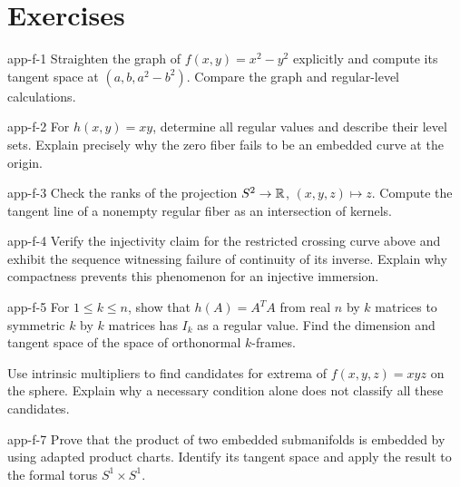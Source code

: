 \section*{Exercises}
\begin{hexercise}{app-f-1}
Straighten the graph of $f(x,y)=x^2-y^2$ explicitly and compute its tangent
space at $(a,b,a^2-b^2)$. Compare the graph and regular-level calculations.
\end{hexercise}
\begin{hexercise}{app-f-2}
For $h(x,y)=xy$, determine all regular values and describe their level sets.
Explain precisely why the zero fiber fails to be an embedded curve at the origin.
\end{hexercise}
\begin{hexercise}{app-f-3}
Check the ranks of the projection $S^2\to\mathbb{R}$, $(x,y,z)\mapsto z$.
Compute the tangent line of a nonempty regular fiber as an intersection of kernels.
\end{hexercise}
\begin{hexercise}{app-f-4}
Verify the injectivity claim for the restricted crossing curve above and
exhibit the sequence witnessing failure of continuity of its inverse.
Explain why compactness prevents this phenomenon for an injective immersion.
\end{hexercise}
\begin{hexercise}{app-f-5}
For $1\leq k\leq n$, show that $h(A)=A^TA$ from real $n$ by $k$
matrices to symmetric $k$ by $k$ matrices has $I_k$ as a regular value.
Find the dimension and tangent space of the space of orthonormal $k$-frames.
\end{hexercise}
\begin{exercise}
Use intrinsic multipliers to find candidates for extrema of
$f(x,y,z)=xyz$ on the sphere. Explain why a necessary condition alone
does not classify all these candidates.
\end{exercise}
\begin{hexercise}{app-f-7}
Prove that the product of two embedded submanifolds is embedded by using
adapted product charts. Identify its tangent space and apply the result
to the formal torus $S^1\times S^1$.
\end{hexercise}
